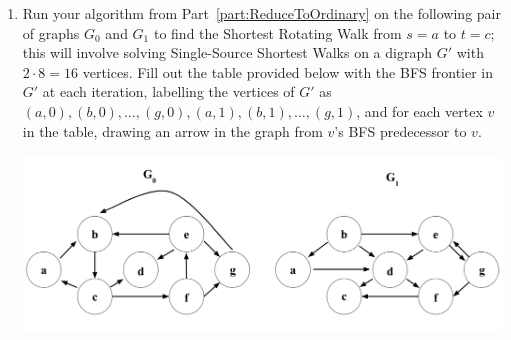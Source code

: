 \documentclass[11pt]{article}
\begin{document}
\begin{enumerate}
\begin{enumerate}
\begin{proof}
We construct a digraph $G'$ with $kn$ vertices that are each labeled with an ordered pair $(v, j)$ where $v \in V$ and $j \in 0, 1, \dots, k - 1$ (the size is what I claim because $n = |V|$). Then we transfer edges from our graphs $G_0, \dots, G_{k - 1}$ to $G'$ by drawing an edge between $(v_m, j)$ and $(v_n, j + 1)$ if there exists an edge from $v_m$ to $v_n$ on the graph $G_j$ and $j < k - 1$; if $j = k -1$ and there exists an edge from $v_m$ to $v_n$ on $G_j$, then we draw an edge from $(v_m, j)$ to $(v_n, 0)$ on $G'$. 

This works as a transformation because this digraph only contains edges that describe moves that we can make in a Shortest Rotating Walk algorithm, and it contains every such move (as described by the process of creating the graph above). Now we test the runtime.

Knowing that we can use BFS to find the Single-Source Shortest Walk of a graph from class, we rely on the idea that if some graph $G$ has $n$ vertices and $m$ edges, we have a runtime of $O(n + m)$ when implementing the algorithm. We listed above that $G'$ has $kn$ vertices, so the first term is taken care of. For our second term, every single edge in each graph $G_i$ goes to $G'$ and there is no edge in $G'$ that is not in a graph $G_i$. Therefore the number of edges in $G'$ is the sum of the numbers of edges in each $G_i$, which means we get a runtime $G(kn + m_0 + \dots + m_{k - 1})$, as desired.
\end{proof}
        
        \item Run your algorithm from Part~\ref{part:ReduceToOrdinary} on the following pair of graphs $G_0$ and $G_1$ to find the Shortest Rotating Walk from $s=a$ to $t=c$; this will involve solving Single-Source Shortest Walks on a digraph $G'$ with $2\cdot 8=16$ vertices. Fill out the table provided below with the BFS frontier in $G'$ at each iteration, labelling the vertices of $G'$ as $(a, 0),(b, 0),\ldots,(g,0),(a,1),(b,1),\ldots,(g,1)$, and for each vertex $v$ in the table, drawing an arrow in the graph from $v$'s BFS predecessor to $v$.  \label{part:BFS}

            \includegraphics[width=14cm]{ps4_graphs_new.png}


\end{enumerate}
\end{enumerate}
\end{document}
